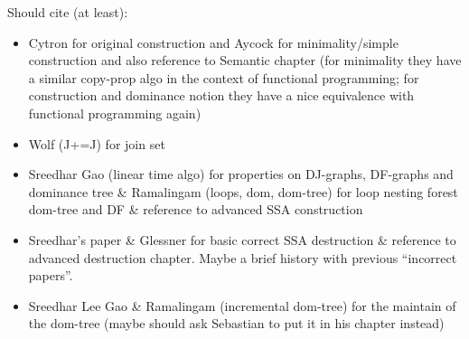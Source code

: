 Should cite (at least):
\begin{itemize}
\item Cytron for original construction and Aycock for minimality/simple construction and also reference to Semantic chapter (for minimality they have a similar copy-prop algo in the context of functional programming; for construction and dominance notion they have a nice equivalence with functional programming again) 
\item Wolf (J+=J) for join set
\item Sreedhar Gao (linear time algo) for properties on DJ-graphs, DF-graphs and dominance tree \& Ramalingam (loops, dom, dom-tree) for loop nesting forest dom-tree and DF \& reference to advanced SSA construction
\item Sreedhar's paper \& Glessner for basic correct SSA destruction \& reference to advanced destruction chapter. Maybe a brief history with previous ``incorrect papers''.
\item Sreedhar Lee Gao \& Ramalingam (incremental dom-tree) for the maintain of the dom-tree (maybe should ask Sebastian to put it in his chapter instead)
\end{itemize}
